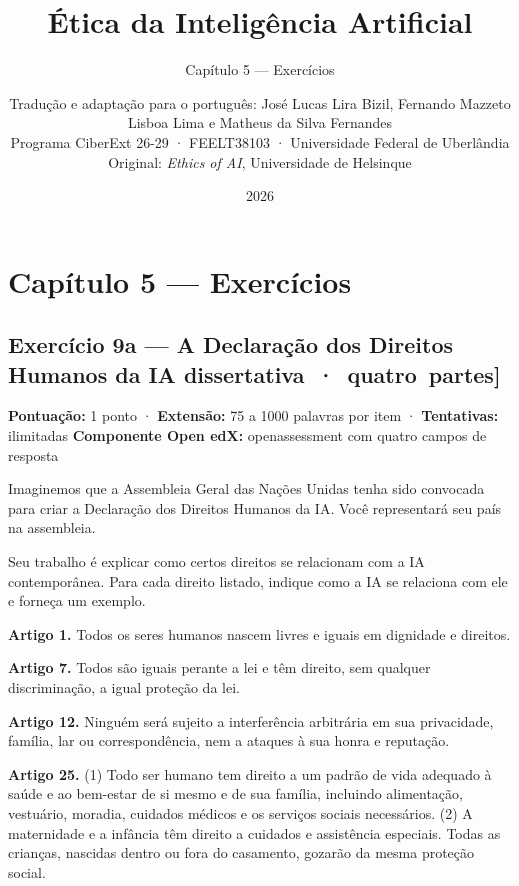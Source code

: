 \documentclass[
  11pt,
]{article}
\title{Ética da Inteligência Artificial}
\subtitle{Capítulo 5 --- Exercícios}
\author{Tradução e adaptação para o português: José Lucas Lira Bizil,
Fernando Mazzeto Lisboa Lima e Matheus da Silva Fernandes\\
Programa CiberExt 26-29 · FEELT38103 · Universidade Federal de
Uberlândia\\
Original: \emph{Ethics of AI}, Universidade de Helsinque}
\date{2026}
\renewcommand{\texttt}[1]{{\color{iaAmeixa}\small\ttfamily #1}}
\begin{document}
\maketitle

{
\hypersetup{linkcolor=iaConceitos}
\setcounter{tocdepth}{2}
\tableofcontents
}
\hypertarget{capuxedtulo-5-exercuxedcios}{%
\section{Capítulo 5 --- Exercícios}\label{capuxedtulo-5-exercuxedcios}}

\hypertarget{exercuxedcio-9a-a-declarauxe7uxe3o-dos-direitos-humanos-da-ia-dissertativa-quatro-partes}{%
\subsection{\texorpdfstring{Exercício 9a --- A Declaração dos Direitos
Humanos da IA
\texttt{{[}dissertativa\ ·\ quatro\ partes{]}}}{Exercício 9a --- A Declaração dos Direitos Humanos da IA {[}dissertativa · quatro partes{]}}}\label{exercuxedcio-9a-a-declarauxe7uxe3o-dos-direitos-humanos-da-ia-dissertativa-quatro-partes}}

\textbf{Pontuação:} 1 ponto · \textbf{Extensão:} 75 a 1000 palavras por
item · \textbf{Tentativas:} ilimitadas \textbf{Componente Open edX:}
\texttt{openassessment} com quatro campos de resposta

Imaginemos que a Assembleia Geral das Nações Unidas tenha sido convocada
para criar a Declaração dos Direitos Humanos da IA. Você representará
seu país na assembleia.

Seu trabalho é explicar como certos direitos se relacionam com a IA
contemporânea. Para cada direito listado, indique como a IA se relaciona
com ele e forneça um exemplo.

\textbf{Artigo 1.} Todos os seres humanos nascem livres e iguais em
dignidade e direitos.

\textbf{Artigo 7.} Todos são iguais perante a lei e têm direito, sem
qualquer discriminação, a igual proteção da lei.

\textbf{Artigo 12.} Ninguém será sujeito a interferência arbitrária em
sua privacidade, família, lar ou correspondência, nem a ataques à sua
honra e reputação.

\textbf{Artigo 25.} (1) Todo ser humano tem direito a um padrão de vida
adequado à saúde e ao bem-estar de si mesmo e de sua família, incluindo
alimentação, vestuário, moradia, cuidados médicos e os serviços sociais
necessários. (2) A maternidade e a infância têm direito a cuidados e
assistência especiais. Todas as crianças, nascidas dentro ou fora do
casamento, gozarão da mesma proteção social.
\end{document}
